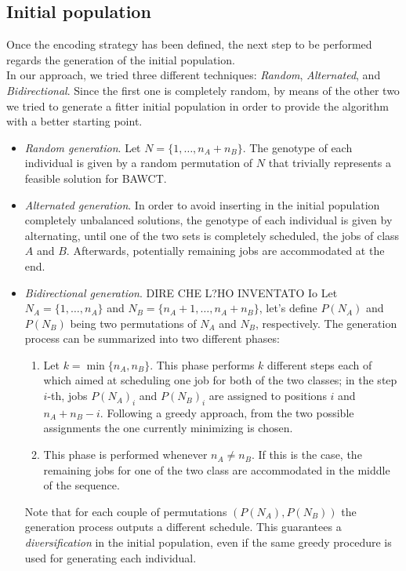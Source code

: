 \documentclass[opre,nonblindrev]{informs3} %
\begin{document}
\subsection{Initial population}
Once the encoding strategy has been defined, the next step to be performed regards the generation of the initial population.\\
In our approach, we tried three different techniques: \textit{Random}, \textit{Alternated}, and \textit{Bidirectional}. Since the first one is completely random, by means of the other two we tried to generate a fitter initial population in order to provide the algorithm with a better starting point.
\begin{itemize}
	\item \textit{Random generation}. Let $N=\{1,\ldots,n_A+n_B\}.$ The genotype of each individual is given by a random permutation of $N$ that trivially represents a feasible solution for BAWCT.
	\item \textit{Alternated generation}. In order to avoid inserting in the initial population completely unbalanced solutions, the genotype of each individual is given by alternating, until one of the two sets is completely scheduled, the jobs of class $A$ and $B$. Afterwards, potentially remaining jobs are accommodated at the end.
	\item \textit{Bidirectional generation}. DIRE CHE L?HO INVENTATO Io Let $N_A=\{1,\ldots,n_A\}$ and  $N_B=\{n_A+1,\ldots,n_A+n_B\}$, let's define $P(N_A)$ and $P(N_B)$ being two permutations of $N_A$ and $N_B$, respectively. The generation process can be summarized into two different phases:
	\begin{enumerate}
		\item Let $k = \min\{n_A,n_B\}$. This phase performs $k$ different steps each of which aimed at scheduling one job for both of the two classes; in the step $i$-th, jobs $P(N_A)_i$ and $P(N_B)_i$ are assigned to positions $i$ and $n_A+n_B-i$. Following a greedy approach, from the two possible assignments the one currently minimizing  is chosen.  
		\item This phase is performed whenever $n_A \ne n_B$. If this is the case, the remaining jobs for one of the two class are accommodated in the middle of the sequence. 
	\end{enumerate}
	Note that for each couple of permutations $(P(N_A),P(N_B))$ the generation process outputs a different schedule. This guarantees a \textit{diversification} in the initial population, even if the same greedy procedure is used for generating each individual.
\end{itemize}
\end{document}
